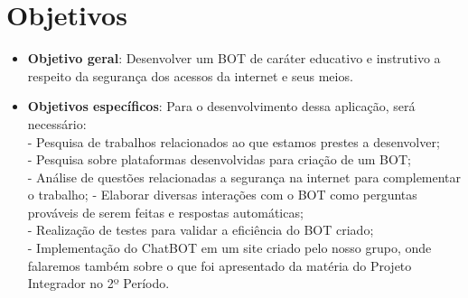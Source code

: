 \section{Objetivos}
\label{objetivos}


\begin{itemize}
		\item \textbf{Objetivo geral}: Desenvolver um BOT de caráter educativo e instrutivo a respeito da segurança dos acessos da internet e seus meios.
		
		\item \textbf{Objetivos específicos}: Para o desenvolvimento dessa aplicação, será necessário: \\ 
		- Pesquisa de trabalhos relacionados ao que estamos prestes a desenvolver; \\
		- Pesquisa sobre plataformas desenvolvidas para criação de um BOT; \\
		- Análise de questões relacionadas a segurança na internet para complementar o trabalho;
		- Elaborar diversas interações com o BOT como perguntas prováveis de serem feitas e respostas automáticas; \\
		- Realização de testes para validar a eficiência do BOT criado; \\
		- Implementação do ChatBOT \cite{chatbot} em um site criado pelo nosso grupo, onde falaremos também sobre o que foi apresentado da matéria do Projeto Integrador no 2º Período.
		
		
\end{itemize}
